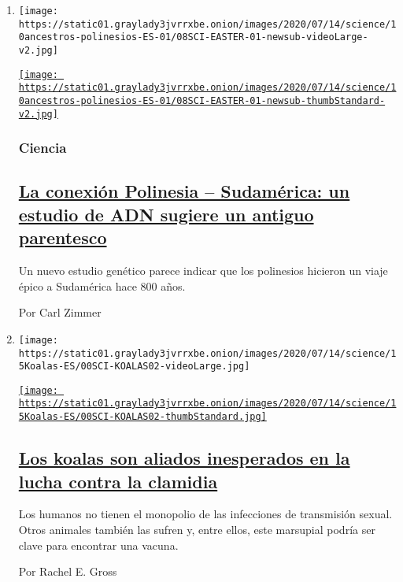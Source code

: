 \begin{enumerate}
\def\labelenumi{\arabic{enumi}.}
\item
  \texttt{[image: https://static01.graylady3jvrrxbe.onion/images/2020/07/14/science/10ancestros-polinesios-ES-01/08SCI-EASTER-01-newsub-videoLarge-v2.jpg]}

  \href{/es/2020/07/10/espanol/ciencia-y-tecnologia/polinesios-estudio-genetico.html}{\texttt{[image: https://static01.graylady3jvrrxbe.onion/images/2020/07/14/science/10ancestros-polinesios-ES-01/08SCI-EASTER-01-newsub-thumbStandard-v2.jpg]}}

  \hypertarget{ciencia}{%
  \subsubsection{Ciencia}\label{ciencia}}

  \hypertarget{la-conexiuxf3n-polinesia--sudamuxe9rica-un-estudio-de-adn-sugiere-un-antiguo-parentesco}{%
  \subsection{\texorpdfstring{\href{/es/2020/07/10/espanol/ciencia-y-tecnologia/polinesios-estudio-genetico.html}{La
  conexión Polinesia -- Sudamérica: un estudio de ADN sugiere un antiguo
  parentesco}}{La conexión Polinesia -- Sudamérica: un estudio de ADN sugiere un antiguo parentesco}}\label{la-conexiuxf3n-polinesia--sudamuxe9rica-un-estudio-de-adn-sugiere-un-antiguo-parentesco}}

  Un nuevo estudio genético parece indicar que los polinesios hicieron
  un viaje épico a Sudamérica hace 800 años.

  Por Carl Zimmer
\item
  \texttt{[image: https://static01.graylady3jvrrxbe.onion/images/2020/07/14/science/15Koalas-ES/00SCI-KOALAS02-videoLarge.jpg]}

  \href{/es/2020/07/15/espanol/ciencia-y-tecnologia/koalas-clamidia.html}{\texttt{[image: https://static01.graylady3jvrrxbe.onion/images/2020/07/14/science/15Koalas-ES/00SCI-KOALAS02-thumbStandard.jpg]}}

  \hypertarget{los-koalas-son-aliados-inesperados-en-la-lucha-contra-la-clamidia}{%
  \subsection{\texorpdfstring{\href{/es/2020/07/15/espanol/ciencia-y-tecnologia/koalas-clamidia.html}{Los
  koalas son aliados inesperados en la lucha contra la
  clamidia}}{Los koalas son aliados inesperados en la lucha contra la clamidia}}\label{los-koalas-son-aliados-inesperados-en-la-lucha-contra-la-clamidia}}

  Los humanos no tienen el monopolio de las infecciones de transmisión
  sexual. Otros animales también las sufren y, entre ellos, este
  marsupial podría ser clave para encontrar una vacuna.

  Por Rachel E. Gross
\end{enumerate}

